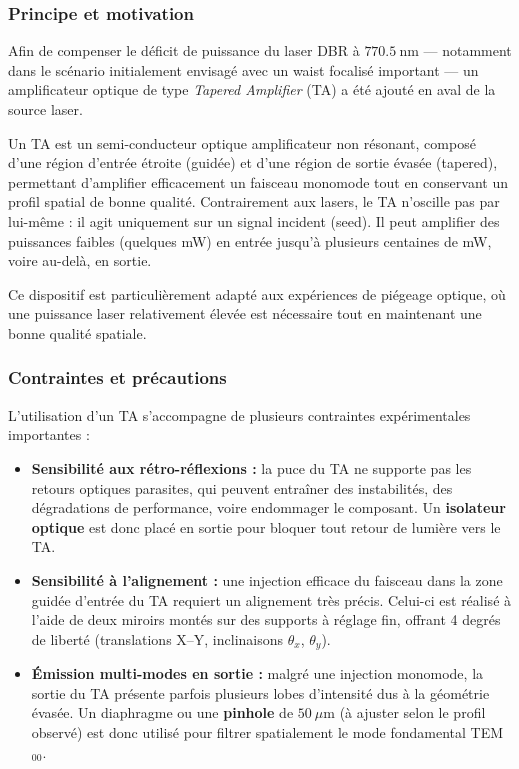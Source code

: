 \subsubsection*{Principe et motivation}

Afin de compenser le déficit de puissance du laser DBR à $770.5~\text{nm}$ — notamment dans le scénario initialement envisagé avec un waist focalisé important — un amplificateur optique de type \textit{Tapered Amplifier} (TA) a été ajouté en aval de la source laser.

Un TA est un semi-conducteur optique amplificateur non résonant, composé d'une région d'entrée étroite (guidée) et d'une région de sortie évasée (tapered), permettant d'amplifier efficacement un faisceau monomode tout en conservant un profil spatial de bonne qualité. Contrairement aux lasers, le TA n'oscille pas par lui-même : il agit uniquement sur un signal incident (seed). Il peut amplifier des puissances faibles (quelques mW) en entrée jusqu’à plusieurs centaines de mW, voire au-delà, en sortie.

Ce dispositif est particulièrement adapté aux expériences de piégeage optique, où une puissance laser relativement élevée est nécessaire tout en maintenant une bonne qualité spatiale.

\subsubsection*{Contraintes et précautions}

L'utilisation d’un TA s’accompagne de plusieurs contraintes expérimentales importantes :

\begin{itemize}[label=$\bullet$]
    \item \textbf{Sensibilité aux rétro-réflexions :} la puce du TA ne supporte pas les retours optiques parasites, qui peuvent entraîner des instabilités, des dégradations de performance, voire endommager le composant. Un \textbf{isolateur optique} est donc placé en sortie pour bloquer tout retour de lumière vers le TA.
    
    \item \textbf{Sensibilité à l’alignement :} une injection efficace du faisceau dans la zone guidée d’entrée du TA requiert un alignement très précis. Celui-ci est réalisé à l’aide de deux miroirs montés sur des supports à réglage fin, offrant 4 degrés de liberté (translations X–Y, inclinaisons $\theta_x$, $\theta_y$).
    
    \item \textbf{Émission multi-modes en sortie :} malgré une injection monomode, la sortie du TA présente parfois plusieurs lobes d’intensité dus à la géométrie évasée. Un diaphragme ou une \textbf{pinhole} de $50~\mu$m (à ajuster selon le profil observé) est donc utilisé pour filtrer spatialement le mode fondamental TEM$_{00}$.
\end{itemize}

